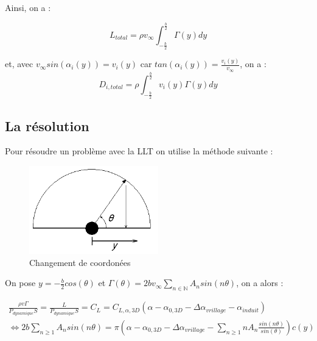 Ainsi, on a :

\begin{equation}
    L_{total} = \rho v_{\infty} \int_{-\frac{b}{2}}^{\frac{b}{2}} \Gamma(y) dy
\end{equation}

et, avec $v_{\infty} sin(\alpha_i(y)) = v_i(y)$ car $tan(\alpha_i(y)) = \frac{v_i(y)}{v_{\infty}}$, on a :
\begin{equation}
    D_{i,total} = \rho \int_{-\frac{b}{2}}^{\frac{b}{2}} v_{i}(y)\Gamma(y) dy
\end{equation}

\subsection{La résolution} 
\label{subsec:Ch1.1.2}

Pour résoudre un problème avec la LLT on utilise la méthode suivante : 

\begin{figure}[H]
    \centering
    \includegraphics[width=0.5\textwidth]{Pics/01 - Basses Fidélités/Prandtl-lifting-line-coordinate-change.png}  
    \caption{Changement de coordonées}
    \label{fig:llt fchange coord}
\end{figure}

On pose $y = -\frac{b}{2}cos(\theta)$ et $\Gamma(\theta) = 2bv_{\infty} \sum_{n \in \mathbb{N}}^{} A_n sin(n\theta)$, on a alors :

\begin{equation}
    \begin{split}
        \frac{\rho v \Gamma}{P_{dynamique} S} = \frac{L}{P_{dynamique} S} = C_L = C_{L,\alpha,3D}(\alpha - \alpha_{0,3D} - \Delta\alpha_{vrillage} - \alpha_{induit}) \\
        \Leftrightarrow 2b\sum_{n \geq 1}^{} A_n sin(n\theta) = \pi (\alpha - \alpha_{0,3D} - \Delta\alpha_{vrillage} - \sum_{n \geq 1}^{}n A_n \frac{sin(n\theta)}{sin(\theta)})c(y)
    \end{split}
    \label{eq: LLT}
\end{equation}

